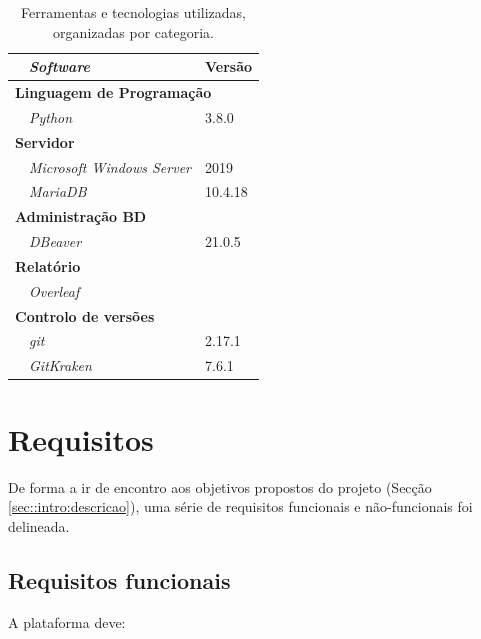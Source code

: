 \begin{table}[!htbp]
	\centering
	\begin{tabular}{p{1cm} l l}
		\toprule
		& {\itshape\bfseries Software} & {\bfseries Versão} \\
		\midrule
		\multicolumn{3}{l}{\bfseries Linguagem de Programação} \\
		& \textit{Python} & 3.8.0 \\
	    \midrule
		\multicolumn{3}{l}{\bfseries Servidor} \\
		& \textit{Microsoft Windows Server} & 2019 \\
		& \textit{MariaDB} & 10.4.18 \\
	    \midrule
		\multicolumn{3}{l}{\bfseries Administração BD} \\
	    & \textit{DBeaver} & 21.0.5 \\
        \midrule
		\multicolumn{3}{l}{\bfseries Relatório} \\
		& \textit{Overleaf} & \\
		\midrule
		\multicolumn{3}{l}{\bfseries Controlo de versões} \\
		& \textit{git} & 2.17.1 \\
		& \textit{GitKraken} & 7.6.1  \\
		\midrule
		\bottomrule
	\end{tabular}
	\caption[Ferramentas utilizadas]{Ferramentas e tecnologias utilizadas, organizadas por categoria.}
	\label{tab::ferramentas}
\end{table}



\section{Requisitos}
\label{sec::engsoft:requisitos}

De forma a ir de encontro aos objetivos propostos do projeto (Secção \ref{sec::intro:descricao}), uma série de requisitos funcionais e não-funcionais foi delineada.

\subsection{Requisitos funcionais}
\label{ssec::engsoft:requisitos:funcionais}

A plataforma deve:

